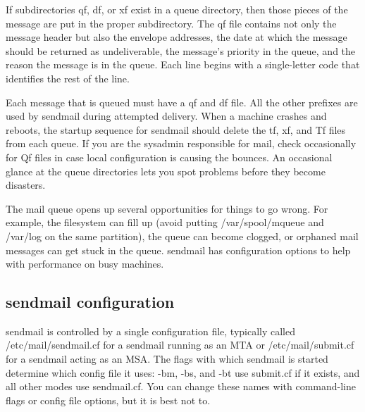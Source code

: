 
If subdirectories {qf}, {df}, or {xf} exist in a queue directory, then
those pieces of the message are put in the proper subdirectory. The {qf}
file contains not only the message header but also the envelope
addresses, the date at which the message should be returned as
undeliverable, the message's priority in the queue, and the reason the
message is in the queue. Each line begins with a single-letter code that
identifies the rest of the line.

Each message that is queued must have a {qf} and {df} file. All the
other prefixes are used by {sendmail} during attempted delivery. When a
machine crashes and reboots, the startup sequence for {sendmail} should
delete the {tf}, {xf}, and {Tf} files from each queue. If you are the
sysadmin responsible for mail, check occasionally for {Qf} files in case
local configuration is causing the bounces. An occasional glance at the
queue directories lets you spot problems before they become disasters.

The mail queue opens up several opportunities for things to go wrong.
For example, the filesystem can fill up (avoid putting
{/var/spool/mqueue} and {/var/log} on the same partition), the queue can
become clogged, or orphaned mail messages can get stuck in the queue.
{sendmail} has configuration options to help with performance on busy
machines.

\protect\hypertarget{part0026_split_028.html}{}{}

\hypertarget{part0026_split_028.htmlux5cux23_idContainer1247}{}
\hypertarget{part0026_split_028.htmlux5cux23calibre_pb_27}{%
\subsection[
configuration]{\texorpdfstring{{\protect\hypertarget{part0026_split_028.htmlux5cux23_idTextAnchor1053}{}{}sendmail}
configuration}{sendmail configuration}}\label{part0026_split_028.htmlux5cux23calibre_pb_27}}

\protect\hypertarget{part0026_split_028.htmlux5cux23_idIndexMarker2507}{}{}{sendmail}
is controlled by a single configuration file, typically called
{/etc/mail/}{\protect\hypertarget{part0026_split_028.htmlux5cux23_idIndexMarker2508}{}{}}{sendmail.cf}
for a {sendmail} running as an MTA or
{/etc/mail/}{\protect\hypertarget{part0026_split_028.htmlux5cux23_idIndexMarker2509}{}{}}{submit.cf}
for a {sendmail} acting as an MSA. The flags with which {sendmail} is
started determine which config file it uses: {-bm}, {-bs}, and {-bt} use
{submit.cf }if it exists, and all other modes use {sendmail.cf}. You can
change these names with command-line flags or config file options, but
it is best not to.

